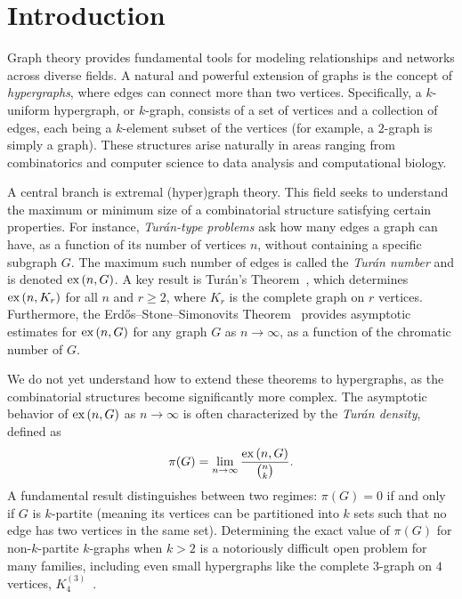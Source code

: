 \section{Introduction}\label{sec:introduction}

Graph theory provides fundamental tools for modeling relationships and networks across diverse fields.
A natural and powerful extension of graphs is the concept of \emph{hypergraphs},
where edges can connect more than two vertices.
Specifically, a $k$-uniform hypergraph, or $k$-graph,
consists of a set of vertices and a collection of edges, each being a $k$-element subset of the vertices
(for example, a $2$-graph is simply a graph).
These structures arise naturally in areas ranging from combinatorics and computer science to data analysis and
computational biology.

A central branch is extremal (hyper)graph theory.
This field seeks to understand the maximum or minimum size of a combinatorial structure satisfying certain properties.
For instance, \emph{Turán-type problems} ask how many edges a graph can have, as a function of its number of vertices $n$,
without containing a specific subgraph $G$.
The maximum such number of edges is called the \emph{Turán number} and is denoted $\text{ex} \left( n, G \right)$.
A key result is Turán's Theorem~\cite{Turan1941},
which determines $\text{ex} \left( n, K_r \right)$ for all $n$ and $r \ge 2$, where $K_r$ is the complete graph on $r$ vertices.
Furthermore, the Erdős--Stone--Simonovits Theorem~\cite{erdos1946structure}
provides asymptotic estimates for $\text{ex} \left( n, G \right)$ for any graph $G$ as $n \to \infty$,
as a function of the chromatic number of $G$.

We do not yet understand how to extend these theorems to hypergraphs,
as the combinatorial structures become significantly more complex.
The asymptotic behavior of $\text{ex} \left( n, G \right)$ as $n \to \infty$
is often characterized by the \emph{Turán density}, defined as
\[
    \pi(G) = \lim_{n \to \infty} \frac{\text{ex} \left( n, G \right)}{\binom{n}{k}}.
\]
A fundamental result distinguishes between two regimes: $\pi(G) = 0$ if and only if $G$ is $k$-partite
(meaning its vertices can be partitioned into $k$ sets such that no edge has two vertices in the same set).
Determining the exact value of $\pi(G)$ for non-$k$-partite $k$-graphs when $k > 2$
is a notoriously difficult open problem for many families,
including even small hypergraphs like the complete $3$-graph on $4$ vertices,
$K_4^{(3)}$~\cite{keevash2011hypergraph, razborov20103}.

